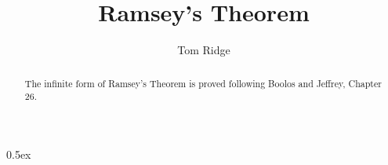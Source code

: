 \documentclass[11pt,a4paper]{article}
\begin{document}
\title{Ramsey's Theorem}
\author{Tom Ridge}
\maketitle

\begin{abstract}
  The infinite form of Ramsey's Theorem is proved following Boolos and
  Jeffrey, Chapter 26.
\end{abstract}

\tableofcontents

\parindent 0pt\parskip 0.5ex


\end{document}
